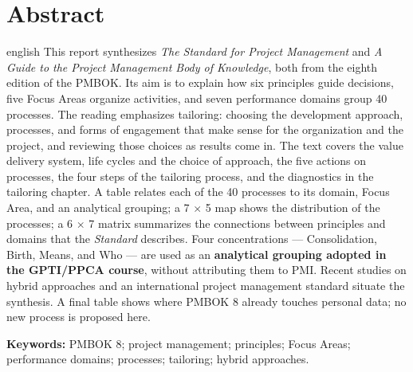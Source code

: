 \documentclass[11pt,a4paper]{article}
\newcommand{\SingleSpacing}{}
\newcommand{\onelineskip}{\baselineskip}
\newenvironment{resumo}[1][Resumo]{\section*{#1}\noindent\ignorespaces}{\bigskip}
\begin{document}
\begin{resumo}[Abstract]
\begin{otherlanguage*}{english}
This report synthesizes \textit{The Standard for Project Management} and \textit{A Guide to the Project Management Body of Knowledge}, both from the eighth edition of the PMBOK. Its aim is to explain how six principles guide decisions, five Focus Areas organize activities, and seven performance domains group 40 processes. The reading emphasizes tailoring: choosing the development approach, processes, and forms of engagement that make sense for the organization and the project, and reviewing those choices as results come in. The text covers the value delivery system, life cycles and the choice of approach, the five actions on processes, the four steps of the tailoring process, and the diagnostics in the tailoring chapter. A table relates each of the 40 processes to its domain, Focus Area, and an analytical grouping; a 7 \ensuremath{\times} 5 map shows the distribution of the processes; a 6 \ensuremath{\times} 7 matrix summarizes the connections between principles and domains that the \textit{Standard} describes. Four concentrations — Consolidation, Birth, Means, and Who — are used as an \textbf{analytical grouping adopted in the GPTI/PPCA course}, without attributing them to PMI. Recent studies on hybrid approaches and an international project management standard situate the synthesis. A final table shows where PMBOK 8 already touches personal data; no new process is proposed here.

\vspace{\onelineskip}
\noindent\textbf{Keywords:} PMBOK 8; project management; principles; Focus Areas; performance domains; processes; tailoring; hybrid approaches.
\end{otherlanguage*}
\end{resumo}
\clearpage

\begingroup
\SingleSpacing
\end{document}
